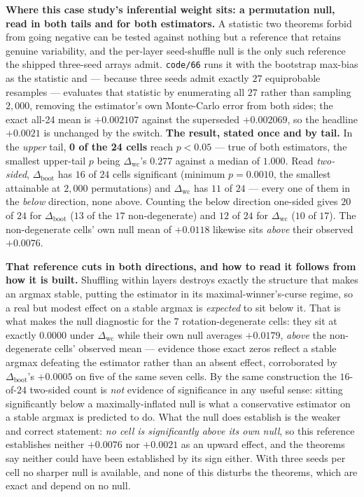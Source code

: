 \documentclass[10pt]{article} %
\begin{document}
\textbf{Where this case study's inferential weight sits: a permutation null,
read in both tails and for both estimators.} A statistic two theorems forbid
from going negative can be tested against nothing but a reference that retains
genuine variability, and the per-layer seed-shuffle null is the only such
reference the shipped three-seed arrays admit. \texttt{code/66} runs it with
the bootstrap max-bias as the statistic and --- because three seeds admit
exactly $27$ equiprobable resamples --- evaluates that statistic by enumerating
all $27$ rather than sampling $2{,}000$, removing the estimator's own
Monte-Carlo error from both sides; the exact all-24 mean is $+0.002107$ against
the superseded $+0.002069$, so the headline $+0.0021$ is unchanged by the
switch. \textbf{The result, stated once and by tail.} In the \emph{upper} tail,
\textbf{0 of the 24 cells} reach $p<0.05$ --- true of both
estimators, the smallest upper-tail $p$ being $\Delta_{\text{wc}}$'s $0.277$
against a median of $1.000$. Read \emph{two-sided}, $\Delta_{\text{boot}}$ has
$16$ of $24$ cells significant (minimum $p=0.0010$, the smallest attainable at
$2{,}000$ permutations) and $\Delta_{\text{wc}}$ has $11$ of $24$ --- every one
of them in the \emph{below} direction, none above. Counting the below direction
one-sided gives $20$ of $24$ for $\Delta_{\text{boot}}$ ($13$ of the $17$
non-degenerate) and $12$ of $24$ for $\Delta_{\text{wc}}$ ($10$ of $17$). The
non-degenerate cells' own null mean of $+0.0118$ likewise sits \emph{above}
their observed $+0.0076$.

\textbf{That reference cuts in both directions, and how to read it follows
from how it is built.} Shuffling within layers destroys exactly the
structure that makes an argmax stable, putting the estimator in its
maximal-winner's-curse regime, so a real but modest effect on a stable
argmax is \emph{expected} to sit below it. That is what makes the null
diagnostic for the $7$ rotation-degenerate cells: they sit at exactly
$0.0000$ under $\Delta_{\text{wc}}$ while their own null averages $+0.0179$,
\emph{above} the non-degenerate cells' observed mean --- evidence those exact
zeros reflect a stable argmax defeating the estimator rather than an absent
effect, corroborated by $\Delta_{\text{boot}}$'s $+0.0005$ on five of the
same seven cells. By the same construction the $16$-of-$24$ two-sided count
is \emph{not} evidence of significance in any useful sense: sitting
significantly below a maximally-inflated null is what a conservative
estimator on a stable argmax is predicted to do. What the null does
establish is the weaker and correct statement: \emph{no cell is significantly
above its own null}, so this reference establishes neither $+0.0076$ nor
$+0.0021$ as an upward effect, and the theorems say neither could have been
established by its sign either. With three seeds per cell no sharper null is
available, and none of this disturbs the theorems, which are exact and
depend on no null.
\end{document}

